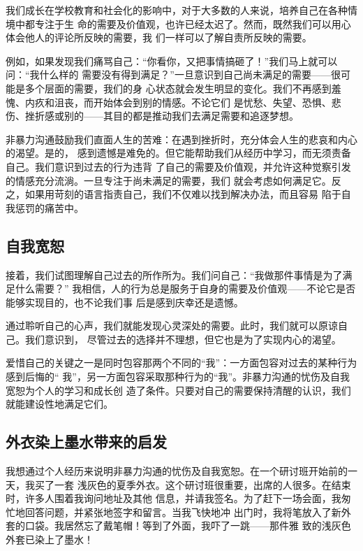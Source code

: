\documentclass{ctexart}
\begin{document}
我们成长在学校教育和社会化的影响中，对于大多数的人来说，培养自己在各种情境中都专注于生
命的需要及价值观，也许已经太迟了。然而，既然我们可以用心体会他人的评论所反映的需要，我
们一样可以了解自责所反映的需要。

例如，如果发现我们痛骂自己：``你看你，又把事情搞砸了！''我们马上就可以问：``我什么样的
需要没有得到满足？''一旦意识到自己尚未满足的需要------很可能是多个层面的需要，我们的身
心状态就会发生明显的变化。我们不再感到羞愧、内疚和沮丧，而开始体会到别的情感。不论它们
是忧愁、失望、恐惧、悲伤、挫折感或别的------其目的都是推动我们去满足需要和追逐梦想。

非暴力沟通鼓励我们直面人生的苦难：在遇到挫折时，充分体会人生的悲哀和内心的渴望。是的，
感到遗憾是难免的。但它能帮助我们从经历中学习，而无须责备自己。我们意识到过去的行为违背
了自己的需要及价值观，并允许这种觉察引发的情感充分流淌。一旦专注于尚未满足的需要，我们
就会考虑如何满足它。反之，如果用苛刻的语言指责自己，我们不仅难以找到解决办法，而且容易
陷于自我惩罚的痛苦中。


\subsection{自我宽恕}

接着，我们试图理解自己过去的所作所为。我们问自己：``我做那件事情是为了满足什么需要？''
我相信，人的行为总是服务于自身的需要及价值观------不论它是否能够实现目的，也不论我们事
后是感到庆幸还是遗憾。

通过聆听自己的心声，我们就能发现心灵深处的需要。此时，我们就可以原谅自己。我们意识到，
尽管过去的选择并不理想，但它也是为了实现内心的渴望。

爱惜自己的关键之一是同时包容那两个不同的``我''：一方面包容对过去的某种行为感到后悔的``
我''，另一方面包容采取那种行为的``我''。非暴力沟通的忧伤及自我宽恕为个人的学习和成长创
造了条件。只要对自己的需要保持清醒的认识，我们就能建设性地满足它们。


\subsection{外衣染上墨水带来的启发}

我想通过个人经历来说明非暴力沟通的忧伤及自我宽恕。在一个研讨班开始前的一天，我买了一套
浅灰色的夏季外衣。这个研讨班很重要，出席的人很多。在结束时，许多人围着我询问地址及其他
信息，并请我签名。为了赶下一场会面，我匆忙地回答问题，并紧张地签字和留言。当我飞快地冲
出门时，我将笔放入了新外套的口袋。我居然忘了戴笔帽！等到了外面，我吓了一跳------那件雅
致的浅灰色外套已染上了墨水！
\end{document}
